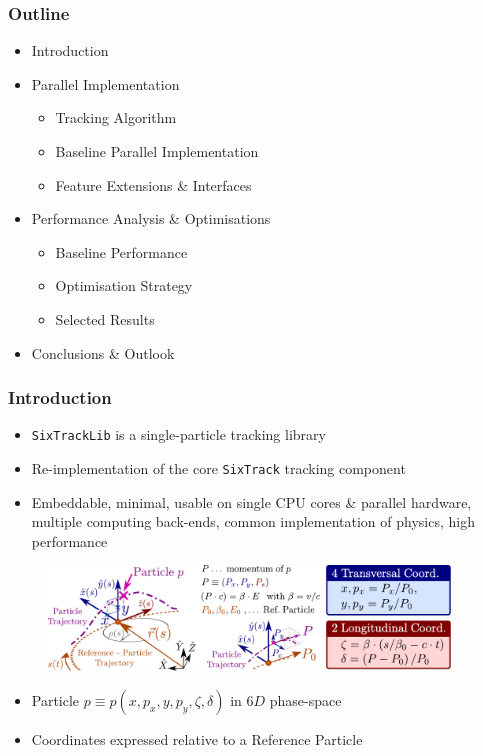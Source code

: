 \documentclass{beamer}
\begin{document}
\begin{frame}
\frametitle{Outline}
\begin{itemize}
    \item Introduction
    \item Parallel Implementation
    \begin{itemize}
        \item Tracking Algorithm
        \item Baseline Parallel Implementation
        \item Feature Extensions \& Interfaces
    \end{itemize}
    \item Performance Analysis \& Optimisations
    \begin{itemize}
        \item Baseline Performance
        \item Optimisation Strategy
        \item Selected Results
    \end{itemize}
    \item Conclusions \& Outlook
\end{itemize}
\end{frame}

\begin{frame}
\frametitle{Introduction}
\begin{itemize}
    \item \texttt{SixTrackLib}\cite{sixtracklib-repo-2021} is a {\color{MyDarkBlue} single-particle} tracking library
    \item Re-implementation of the core \texttt{SixTrack}\cite{demaria-sixtrack-2019, sixtrack-repo-2021} tracking component
    \item Embeddable, minimal, usable on single CPU cores \& parallel hardware, multiple computing back-ends, common implementation of physics, high performance
\end{itemize}
\begin{figure}[h]
    \centering
    \includegraphics[width=0.95\textwidth]{poster_images/fig_coordinates_all}
\end{figure}
\begin{itemize}
    \item Particle $p \equiv p\left( x, p_x, y, p_y, \zeta, \delta\right)$ in $6D$ phase-space
    \item Coordinates expressed relative to a {\color{MyDarkOrange}Reference Particle}
\end{itemize}
\end{frame}
\end{document}
